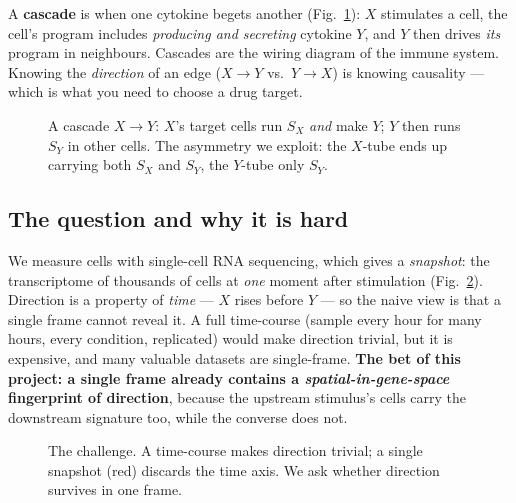 \documentclass[11pt]{article}
\begin{document}
A \textbf{cascade} is when one cytokine begets another (Fig.~\ref{fig:f2}):
$X$ stimulates a cell, the cell's program includes \emph{producing and secreting}
cytokine $Y$, and $Y$ then drives \emph{its} program in neighbours. Cascades are
the wiring diagram of the immune system. Knowing the \emph{direction} of an edge
($X\!\to\!Y$ vs.\ $Y\!\to\!X$) is knowing causality --- which is what you need to
choose a drug target.

\begin{figure}[h]\centering
{}
\caption{A cascade $X\!\to\!Y$: $X$'s target cells run $S_X$ \emph{and} make $Y$;
$Y$ then runs $S_Y$ in other cells. The asymmetry we exploit: the $X$-tube ends up
carrying both $S_X$ and $S_Y$, the $Y$-tube only $S_Y$.}\label{fig:f2}
\end{figure}

\subsection{The question and why it is hard}
We measure cells with single-cell RNA sequencing, which gives a \emph{snapshot}:
the transcriptome of thousands of cells at \emph{one} moment after stimulation
(Fig.~\ref{fig:f3}). Direction is a property of \emph{time} --- $X$ rises before
$Y$ --- so the naive view is that a single frame cannot reveal it. A full
time-course (sample every hour for many hours, every condition, replicated) would
make direction trivial, but it is expensive, and many valuable datasets are
single-frame. \textbf{The bet of this project: a single frame already contains a
\emph{spatial-in-gene-space} fingerprint of direction}, because the upstream
stimulus's cells carry the downstream signature too, while the converse does not.

\begin{figure}[h]\centering
{}
\caption{The challenge. A time-course makes direction trivial; a single snapshot
(red) discards the time axis. We ask whether direction survives in one frame.}
\label{fig:f3}
\end{figure}
\end{document}
